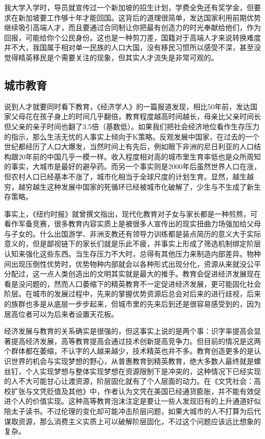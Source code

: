 \documentclass[]{book}
\begin{document}
我大学入学时，导员就宣传过一个新加坡的招生计划，学费全免还有奖学金，但要求在新加坡要工作够十年才能回国。这背后的道理很简单，发达国家利用前期优势继续吸引高端人才，而且要通过合同制让你把最有创造力的时光奉献给他们，作为回报，可能给你个公民身份。这也是一种剪刀差，国籍对于高端人才来说转换难度并不大，我国属于相对单一民族的人口大国，没有移民习惯所以感受不深，甚至没觉得精英移民是个需要关注的现象，但其实人才流失是非常可观的。

\hypertarget{ux57ceux5e02ux6559ux80b2}{%
\subsection{城市教育}\label{ux57ceux5e02ux6559ux80b2}}

说到人才就要同时看下教育，《经济学人》的一篇报道发现，相比50年前，发达国家父母花在孩子身上的时间几乎翻倍，教育程度越高时间越长，母亲比父亲时间长但父亲的亲子时间也翻了3.5倍（基数低）。如果我们把社会经济地位看作生存压力的指示，那么生活无忧的人事实上倾向于K策略。反观发展中国家，在过去的一个世纪都经历了人口大爆发，当然时间上有先后，例如眼下非洲的尼日利亚的人口结构跟20年前的中国几乎一模一样。收入程度相对高的城市里生育率低也是众所周知的事实，大城市是最好的避孕药。而另一个事实则是2000年后虽然世界人口在涨，但农村人口已经基本不涨了，城市化相当于全球尺度的计划生育。显然，越生越穷，越穷越生这种发展中国家的死循环已经被城市化破解了，少生与不生成了新生存策略。

事实上，《纽约时报》就曾撰文指出，现代化教育对子女与家长都是一种煎熬，可看作军备竞赛，很多教育内容实质上是被很多人宣传出的现实扭曲力场强加给父母与子女的。什么出国游学、非洲支教还有领导力训练都是装点简历的意义大于实际意义的，但是鄙视链下的家长们就是乐此不疲，并事实上形成了筛选机制绑定阶层认知来强化这些东西。当生存压力不大时，总得有其他压力来制造内部差异。物种间出现压倒性优势时，优势物种内部就会以各种形式出现分化，资源从来就没公平分配过，这一点人类创造出的文明其实就是最大的推手。教育会促进经济发展现在看是没问题的，然而人口萎缩下的精英教育不一定促进经济发展，更可能固化社会阶层。在城市的发展过程中，先来的掌握优势资源后总会对后来的进行歧视，后来的族群也多是从底层一步步起来，但城市里的先来后到还是很容易感受到的，因为居高位者可以为后来者设置天花板。

经济发展与教育的关系确实是很强的，但这事实上说的是两个事：识字率提高会显著提高经济发展，高等教育提高会通过技术创新提高竞争力。但目前的情况是这两个群体都在萎缩，不认字的人越来越少，技术精英也并不多。教育创造更多的是认识世界的机会与实现梦想的野心，从普惠教育到精英教育，绝大多数人最终就是螺丝钉，个人实现梦想与整体实现梦想在资源限制下是冲突的，这种情况下已经实现的人不大可能甘心让渡资源，阶层固化就有了个人层面的动力。在《文凭社会：高校扩张与文凭贬值及其他》中，作者认为文凭在美国已经通货膨胀，并不能有效促进个人的价值实现。这种高等教育泡沫注定是要让一些人发现旧有的上升通道好似陪太子读书。不过伦理的变化却可能冲击阶层问题，如果大城市的人不打算为后代谋取资源，那么消费主义实质上可以破解阶层固化，不过这个问题应该远比想象的复杂。
\end{document}
